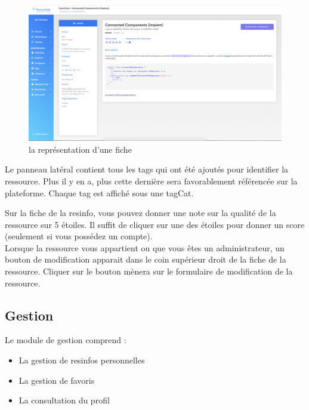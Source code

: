 \begin{figure}[H]
    \includegraphics[width=\textwidth,height=\textheight,keepaspectratio]{images/client/fiche.png}
    \centering
    \caption[SourceCode : la représentation d'une \gls{fiche}]{la représentation d'une \gls{fiche}}
\end{figure}


Le panneau latéral contient tous les \glspl{tag} qui ont été ajoutés pour identifier la ressource. Plus il y en a, plus cette dernière sera favorablement référencée sur la plateforme. Chaque \gls{tag} est affiché sous une \gls{tagCat}.


Sur la \gls{fiche} de la \gls{resinfo}, vous pouvez donner une note sur la qualité de la ressource sur 5 étoiles. Il suffit de cliquer sur une des étoiles pour donner un score (seulement si vous possédez un compte).\\

Lorsque la ressource vous appartient ou que vous êtes un administrateur, un bouton de modification apparait dans le coin supérieur droit de la \gls{fiche} de la ressource. Cliquer sur le bouton mènera sur le formulaire de modification de la ressource.\\

\subsection{Gestion}

Le module de gestion comprend :

\begin{itemize}
    \item La gestion de \glspl{resinfo} personnelles
    \item La gestion de favoris
    \item La consultation du profil
\end{itemize}

